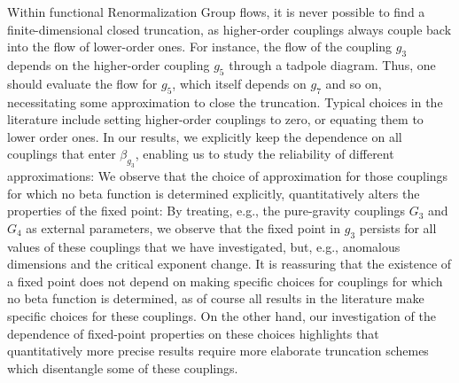 \documentclass[twocolumn,prd,superscriptaddress,preprintnumbers,amsmath,amssymb,nofootinbib]{revtex4}
\begin{document}
 Within functional Renormalization Group flows, it is never possible to find a finite-dimensional closed truncation, as higher-order couplings always couple back into the flow of lower-order ones. For instance, the flow of the coupling $g_3$ depends on the higher-order coupling $g_5$ through a tadpole diagram. Thus, one should evaluate the flow for $g_5$, which itself depends on $g_7$ and so on, necessitating some approximation to close the truncation. Typical choices in the literature include setting higher-order couplings to zero, or equating them to lower order ones. In our results, we explicitly keep the dependence on all couplings that enter $\beta_{g_3}$, enabling us to study the reliability of different approximations:
We observe that the choice of approximation for those couplings for which no beta function is determined explicitly, quantitatively alters the properties of the fixed point: By treating, e.g., the pure-gravity couplings $G_3$ and $G_4$ as external parameters, we observe that the fixed point in $g_3$ persists for all values of these couplings that we have investigated, but, e.g., anomalous dimensions and the critical exponent change. It is reassuring that the existence of a fixed point does not  depend on making specific choices for couplings for which no beta function is determined, as of course all results in the literature make specific choices for these couplings. On the other hand, our investigation of the dependence of fixed-point properties on these choices highlights that quantitatively more precise results require
 more elaborate truncation schemes which disentangle some of these couplings. 
\end{document}
